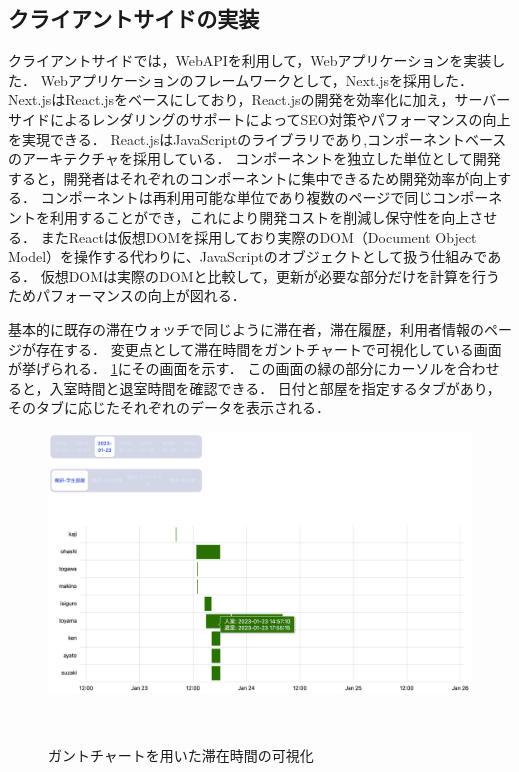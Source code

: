 

\subsection{クライアントサイドの実装}\label{4.1.2}
クライアントサイドでは，WebAPIを利用して，Webアプリケーションを実装した．
Webアプリケーションのフレームワークとして，Next.jsを採用した．
Next.jsはReact.jsをベースにしており，React.jsの開発を効率化に加え，サーバーサイドによるレンダリングのサポートによってSEO対策やパフォーマンスの向上を実現できる．
React.jsはJavaScriptのライブラリであり,コンポーネントベースのアーキテクチャを採用している．
コンポーネントを独立した単位として開発すると，開発者はそれぞれのコンポーネントに集中できるため開発効率が向上する．
コンポーネントは再利用可能な単位であり複数のページで同じコンポーネントを利用することができ，これにより開発コストを削減し保守性を向上させる．
またReactは仮想DOMを採用しており実際のDOM（Document Object Model）を操作する代わりに、JavaScriptのオブジェクトとして扱う仕組みである．
仮想DOMは実際のDOMと比較して，更新が必要な部分だけを計算を行うためパフォーマンスの向上が図れる．



基本的に既存の滞在ウォッチで同じように滞在者，滞在履歴，利用者情報のページが存在する．
変更点として滞在時間をガントチャートで可視化している画面が挙げられる．
\ref{fig:gantt}にその画面を示す．
この画面の緑の部分にカーソルを合わせると，入室時間と退室時間を確認できる．
日付と部屋を指定するタブがあり，そのタブに応じたそれぞれのデータを表示される．

\begin{figure}[tbh]
  \centering
  \includegraphics[width=13cm]{image/gantt.png}
  \caption{ガントチャートを用いた滞在時間の可視化}　\label{fig:gantt}
\end{figure}



